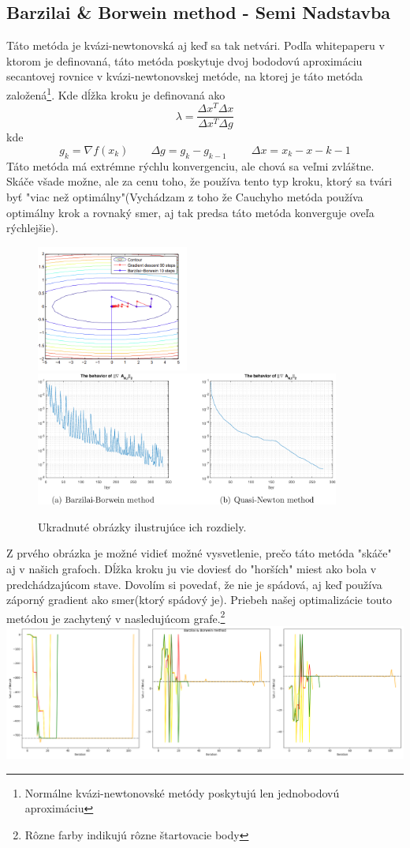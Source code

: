 \documentclass{article}
\begin{document}
\subsection{Barzilai \& Borwein method - Semi Nadstavba}
Táto metóda je kvázi-newtonovská aj keď sa tak netvári. Podľa whitepaperu v ktorom je definovaná, táto metóda poskytuje dvoj bododovú aproximáciu secantovej rovnice v kvázi-newtonovskej metóde, na ktorej je táto metóda založená\footnote{Normálne kvázi-newtonovské metódy poskytujú len jednobodovú aproximáciu}. Kde dĺžka kroku je definovaná ako 
\[\lambda = \frac{\Delta x^T\Delta x}{\Delta x^T\Delta g} \]
kde 
\[g_k = \nabla f(x_k) \qquad \Delta g = g_k - g_{k-1} \qquad\ \Delta x = x_k - x-{k-1}\]
Táto metóda má extrémne rýchlu konvergenciu, ale chová sa veľmi zvláštne. Skáče všade možne, ale za cenu toho, že používa tento typ kroku, ktorý sa tvári byť "viac než optimálny"(Vychádzam z toho že Cauchyho metóda používa optimálny krok a rovnaký smer, aj tak predsa táto metóda konverguje oveľa rýchlejšie). 
\begin{figure}[h!]
  \caption{Ukradnuté obrázky ilustrujúce ich rozdiely.}
  \includegraphics[width=5cm]{GradvsBB.png}
  \includegraphics[width=10cm]{Quasi-BB.png}
\end{figure}
Z prvého obrázka je možné vidieť možné vysvetlenie, prečo táto metóda "skáče" aj v našich grafoch. Dĺžka kroku ju vie doviesť do "horších"  miest ako bola v predchádzajúcom stave. Dovolím si povedať, že nie je spádová, aj keď používa záporný gradient ako smer(ktorý spádový je). Priebeh našej optimalizácie touto metódou je zachytený v nasledujúcom grafe.\footnote{Rôzne farby indikujú rôzne štartovacie body}\\\includegraphics[width=\textwidth]{basil.png}
\end{document}
